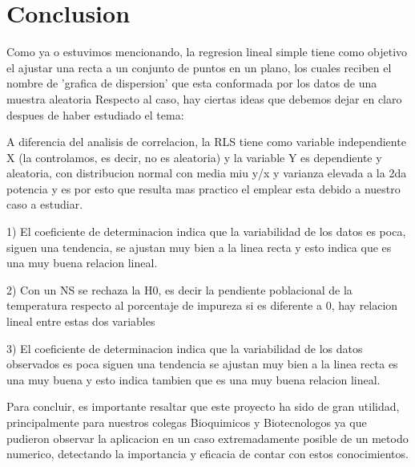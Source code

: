 \documentclass[12pt,a4paper]{report}
\begin{document}
\justify
\section{Conclusion}

Como ya o estuvimos mencionando, la regresion lineal simple tiene como objetivo el ajustar una recta a un conjunto de puntos en un plano, los cuales reciben el nombre de 'grafica de dispersion' que esta conformada por los datos de una muestra aleatoria
Respecto al caso, hay ciertas ideas que debemos dejar en claro despues de haber estudiado el tema:

A diferencia del analisis de correlacion, la RLS tiene como variable independiente X (la controlamos, es decir, no es aleatoria) y la variable Y es dependiente y aleatoria, con distribucion normal con media miu y/x y varianza elevada a la 2da potencia y es por esto que resulta mas practico el emplear esta debido a nuestro caso a estudiar.

1) El coeficiente de determinacion indica que la variabilidad de los datos es poca, siguen una tendencia, se ajustan muy bien a la linea recta y esto indica que es una muy buena relacion lineal.

2) Con un NS se rechaza la H0, es decir la pendiente poblacional de la temperatura respecto al porcentaje de impureza si es diferente a 0, hay relacion lineal entre estas dos variables 

3) El coeficiente de determinacion indica que la variabilidad de los datos observados es poca siguen una tendencia se ajustan muy bien a la linea recta  es una muy buena y esto indica tambien que es una muy buena  relacion lineal.

Para concluir, es importante resaltar que este proyecto ha sido de gran utilidad, principalmente para nuestros colegas Bioquimicos y Biotecnologos ya que pudieron observar la aplicacion en un caso extremadamente posible de un metodo numerico, detectando la importancia y eficacia de contar con estos conocimientos. 
\end{document}
